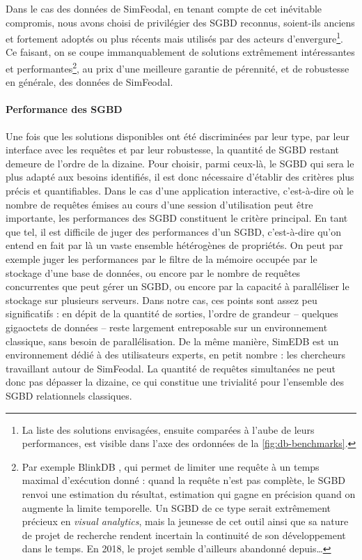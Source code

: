 		Dans le cas des données de SimFeodal, en tenant compte de cet inévitable compromis, nous avons choisi de privilégier des SGBD reconnus, soient-ils anciens et fortement adoptés ou plus récents mais utilisés par des acteurs d'envergure\footnote{
			La liste des solutions envisagées, ensuite comparées à l'aube de leurs performances, est visible dans l'axe des ordonnées de la \cref{fig:db-benchmarks}.
		}.
		Ce faisant, on se coupe immanquablement de solutions extrêmement intéressantes et performantes\footnote{
			Par exemple BlinkDB \autocite{agarwal_blinkdb_2013}, qui permet de limiter une requête à un temps maximal d'exécution donné : quand la requête n'est pas complète, le SGBD renvoi une estimation du résultat, estimation qui gagne en précision quand on augmente la limite temporelle. Un SGBD de ce type serait extrêmement précieux en \textit{visual analytics}, mais la jeunesse de cet outil ainsi que sa nature de projet de recherche rendent incertain la continuité de son développement dans le temps. En 2018, le projet semble d'ailleurs abandonné depuis\ldots
		}, au prix d'une meilleure garantie de pérennité, et de robustesse en générale, des données de SimFeodal.

			\paragraph*{Performance des SGBD}

			Une fois que les solutions disponibles ont été discriminées par leur type, par leur interface avec les requêtes et par leur robustesse, la quantité de SGBD restant demeure de l'ordre de la dizaine.
			Pour choisir, parmi ceux-là, le SGBD qui sera le plus adapté aux besoins identifiés, il est donc nécessaire d'établir des critères plus précis et quantifiables.
			Dans le cas d'une application interactive, c'est-à-dire où le nombre de requêtes émises au cours d'une session d'utilisation peut être importante, les performances des SGBD constituent le critère principal.
			En tant que tel, il est difficile de juger des \og performances\fg{} d'un SGBD, c'est-à-dire qu'on entend en fait par là un vaste ensemble hétérogènes de propriétés.
			On peut par exemple juger les performances par le filtre de la mémoire occupée par le stockage d'une base de données, ou encore par le nombre de requêtes concurrentes que peut gérer un SGBD, ou encore par la capacité à paralléliser le stockage sur plusieurs serveurs.
			Dans notre cas, ces points sont assez peu significatifs : en dépit de la quantité de sorties, l'ordre de grandeur -- quelques gigaoctets de données -- reste largement entreposable sur un environnement classique, sans besoin de parallélisation.
			De la même manière, SimEDB est un environnement dédié à des utilisateurs experts, en petit nombre : les chercheurs travaillant autour de SimFeodal. La quantité de requêtes simultanées ne peut donc pas dépasser la dizaine, ce qui constitue une trivialité pour l'ensemble des SGBD relationnels classiques.

